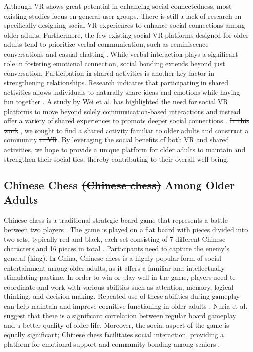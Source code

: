 Although VR shows great potential in enhancing social connectedness, most existing studies focus on general user groups. There is still a lack of research on specifically designing social VR experiences to enhance social connections among older adults. Furthermore, the few existing social VR platforms designed for older adults tend to prioritize verbal communication, such as reminiscence conversations \cite{baker2021school} and casual chatting \cite{baker2019interrogating}. While verbal interaction plays a significant role in fostering emotional connection, social bonding extends beyond just conversation. Participation in shared activities is another key factor in strengthening relationships. Research indicates that participating in shared activities allows individuals to naturally share ideas and emotions while having fun together \cite{evjemo2004supporting,richter2018relations,viguer2010grandparent}. A study by Wei et al. has highlighted the need for social VR platforms to move beyond solely communication-based interactions and instead offer a variety of shared experiences to promote deeper social connections \cite{wei2023bridging}.
\sout{In this work} , we sought to find a shared activity familiar to older adults and construct a  community \sout{in VR}. By leveraging the social benefits of both VR and shared activities, we hope to provide a unique platform for older adults to maintain and strengthen their social ties, thereby contributing to their overall well-being.

\subsection{Chinese Chess \sout{(Chinese chess)} Among Older Adults}

Chinese chess is a traditional strategic board game that represents a battle between two players \cite{leventhal1978}. The game is played on a flat board with pieces divided into two sets, typically red and black, each set consisting of 7 different Chinese characters and 16 pieces in total \cite{lau2011chinese}. Participants need to capture the enemy's general (king). In China, Chinese chess is a highly popular form of social entertainment among older adults, as it offers a familiar and intellectually stimulating pastime. In order to win or play well in the game, players need to coordinate and work with various abilities such as attention, memory, logical thinking, and decision-making. Repeated use of these abilities during gameplay can help maintain and improve cognitive functioning in older adults \cite{hu2012effects,shi2023effect}. Nuria et al. \cite{cibeira2021effectiveness} suggest that there is a significant correlation between regular board gameplay and a better quality of older life. Moreover, the social aspect of the game is equally significant; Chinese chess facilitates social interaction, providing a platform for emotional support and community bonding among seniors \cite{lin2023social,lee2018effect}.

